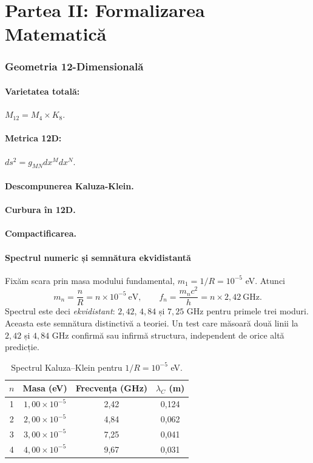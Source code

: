 \documentclass[11pt,a4paper]{article}
\begin{document}
\newpage
\part*{Partea II: Formalizarea Matematică}

\section{Geometria 12-Dimensională}
\subsection{Varietatea totală:} $M_{12} = M_4 \times K_8$.
\subsection{Metrica 12D:} $ds^2 = g_{MN} dx^M dx^N$.
\subsection{Descompunerea Kaluza-Klein.}
\subsection{Curbura în 12D.}
\subsection{Compactificarea.}

\subsection{Spectrul numeric și semnătura ekvidistantă}
Fixăm scara prin masa modului fundamental, $m_1 = 1/R = 10^{-5}$ eV. Atunci
\begin{equation}
m_n = \frac{n}{R} = n \times 10^{-5}\ \text{eV},
\qquad
f_n = \frac{m_n c^2}{h} = n \times 2{,}42\ \text{GHz}.
\end{equation}
Spectrul este deci \emph{ekvidistant}: $2{,}42$, $4{,}84$ și $7{,}25$ GHz pentru primele trei moduri. Aceasta este semnătura distinctivă a teoriei. Un test care măsoară două linii la $2{,}42$ și $4{,}84$ GHz confirmă sau infirmă structura, independent de orice altă predicție.

\begin{table}[H]
\centering
\begin{tabular}{@{}cccc@{}}
\toprule
$n$ & Masa (eV) & Frecvența (GHz) & $\lambda_C$ (m) \\ \midrule
1 & $1{,}00\times10^{-5}$ & 2{,}42 & 0{,}124 \\
2 & $2{,}00\times10^{-5}$ & 4{,}84 & 0{,}062 \\
3 & $3{,}00\times10^{-5}$ & 7{,}25 & 0{,}041 \\
4 & $4{,}00\times10^{-5}$ & 9{,}67 & 0{,}031 \\ \bottomrule
\end{tabular}
\caption{Spectrul Kaluza–Klein pentru $1/R = 10^{-5}$ eV.}
\label{tab:spectru}
\end{table}
\end{document}
